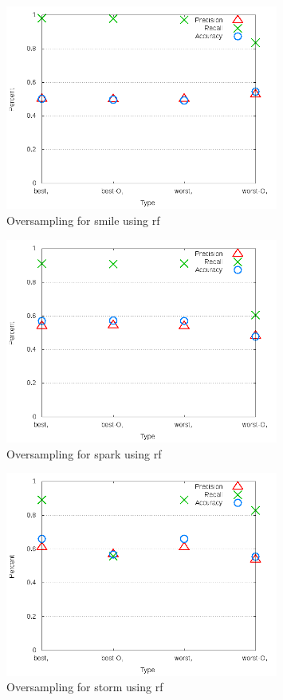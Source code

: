 \begin{figure}[!t]
\centering
\includegraphics[width=0.8\textwidth]{images/rf/test_4/smile_sample_range.png}
\caption{Oversampling for smile using \gls{rf}}
\label{fig:test_4_smile_rf}
\end{figure}

\begin{figure}[!t]
\centering
\includegraphics[width=0.8\textwidth]{images/rf/test_4/spark_sample_range.png}
\caption{Oversampling for spark using \gls{rf}}
\label{fig:test_4_spark_rf}
\end{figure}

\begin{figure}[!t]
\centering
\includegraphics[width=0.8\textwidth]{images/rf/test_4/storm_sample_range.png}
\caption{Oversampling for storm using \gls{rf}}
\label{fig:test_4_storm_rf}
\end{figure}

